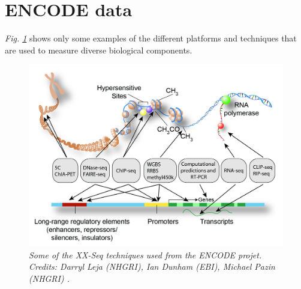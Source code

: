 \section{ENCODE data} \label{encode-data-sect}

\emph{Fig. \ref{seq-pic}} shows only some examples of the different platforms and techniques that are used to measure diverse biological components.

\begin{figure}[!ht]
\begin{center}
 \includegraphics[scale = 0.25]{images/encode-seq.png}
\caption{\emph{Some of the XX-Seq techniques used from the ENCODE projet. Credits: Darryl Leja (NHGRI), Ian Dunham (EBI), Michael Pazin (NHGRI) \citep{Dunham2012}.}}
\label{seq-pic}
\end{center}
\end{figure} 